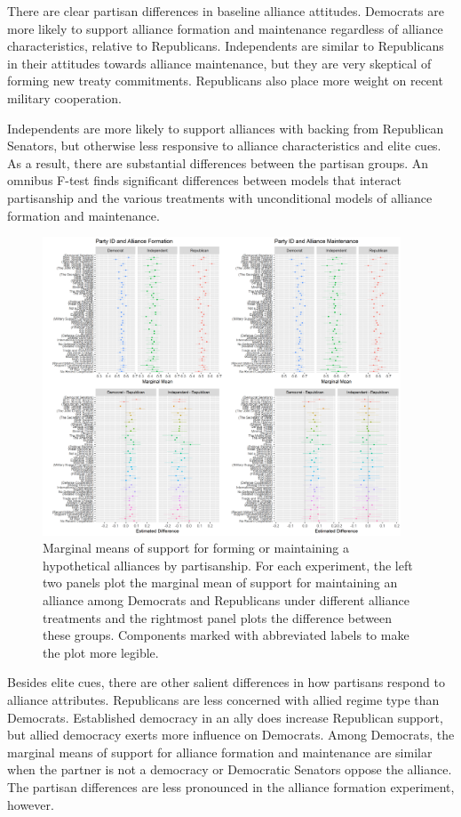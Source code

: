 \documentclass[12pt]{article}
\begin{document}
There are clear partisan differences in baseline alliance attitudes.
Democrats are more likely to support alliance formation and maintenance regardless of alliance characteristics, relative to Republicans. 
Independents are similar to Republicans in their attitudes towards alliance maintenance, but they are very skeptical of forming new treaty commitments. 
Republicans also place more weight on recent military cooperation. 


Independents are more likely to support alliances with backing from Republican Senators, but otherwise less responsive to alliance characteristics and elite cues. 
As a result, there are substantial differences between the partisan groups. 
An omnibus F-test finds significant differences between models that interact partisanship and the various treatments with unconditional models of alliance formation and maintenance. 


\begin{figure}
	\centering
		\includegraphics[width=0.95\textwidth]{../figures/joint-part-plots.png}
	\caption{Marginal means of support for forming or maintaining a hypothetical alliances by partisanship. For each experiment, the left two panels plot the marginal mean of support for maintaining an alliance among Democrats and Republicans under different alliance treatments and the rightmost panel plots the difference between these groups. Components marked with abbreviated labels to make the plot more legible.}
	\label{fig:joint-part-plots}
\end{figure}


Besides elite cues, there are other salient differences in how partisans respond to alliance attributes.
Republicans are less concerned with allied regime type than Democrats.  
Established democracy in an ally does increase Republican support, but allied democracy exerts more influence on Democrats. 
Among Democrats, the marginal means of support for alliance formation and maintenance are similar when the partner is not a democracy or Democratic Senators oppose the alliance.  
The partisan differences are less pronounced in the alliance formation experiment, however. 
\end{document}
